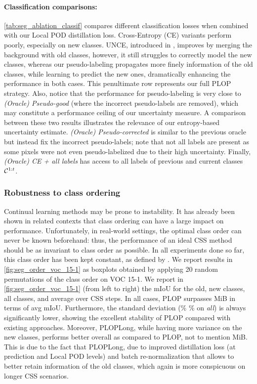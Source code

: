 \paragraph{Classification comparisons:} \autoref{tab:seg_ablation_classif} compares different
classification losses when combined with our Local POD distillation loss. Cross-Entropy (CE)
variants perform poorly, especially on new classes. UNCE, introduced in
\citep{cermelli2020modelingthebackground}, improves by merging the background with old classes,
however, it still struggles to correctly model the new classes, whereas our pseudo-labeling
propagates more finely information of the old classes, while learning to predict the new ones,
dramatically enhancing the performance in both cases. This penultimate row represents our full PLOP
strategy. Also, notice that the performance for pseudo-labeling is very close to
\textit{(Oracle) Pseudo-good} (where the incorrect pseudo-labels are removed), which may constitute a
performance ceiling of our uncertainty measure. A comparison between these two results illustrates
the relevance of our entropy-based uncertainty estimate. \textit{(Oracle) Pseudo-corrected} is
similar to the previous oracle but instead fix the incorrect pseudo-labels; note that not all labels
are present as some pixels were not even pseudo-labelized due to their high uncertainty. Finally,
\textit{(Oracle) CE + all labels} has access to all labels of previous and current classes
$\mathcal{C}^{1:t}$.

\subsubsection{Robustness to class ordering}

Continual learning methods may be prone to instability. It has already been shown in related
contexts \citep{kim2019medic} that class ordering can have a large impact on performance.
Unfortunately, in real-world settings, the optimal class order can never be known beforehand: thus,
the performance of an ideal \ac{CSS} method should be as invariant to class order as possible. In all
experiments done so far, this class order has been kept constant, as defined
by \cite{cermelli2020modelingthebackground}. We report results in \autoref{fig:seg_order_voc_15-1}
as boxplots obtained by applying 20 random permutations of the class order on VOC 15-1. We report in
\autoref{fig:seg_order_voc_15-1} (from left to right) the \ac{mIoU} for the old, new classes, all
classes, and average over \ac{CSS} steps. In all cases, PLOP surpasses MiB in terms of avg \ac{mIoU}.
Furthermore, the standard deviation (\% \% on \textit{all}) is always significantly
lower, showing the excellent stability of PLOP compared with existing approaches. Moreover,
PLOPLong, while having more variance on the new classes, performs better overall as compared to
PLOP, not to mention MiB. This is due to the fact that PLOPLong, due to improved distillation loss
(at prediction and Local POD levels) and batch re-normalization that allows to better retain
information of the old classes, which again is more conspicuous on longer \ac{CSS} scenarios.

